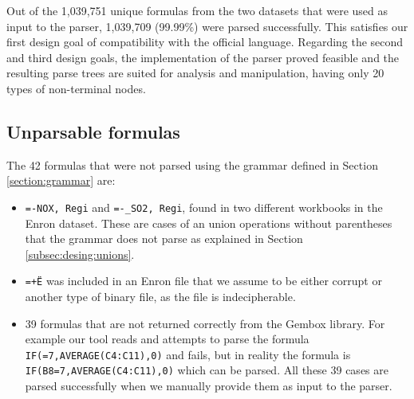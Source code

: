 \documentclass[conference]{IEEEtran}
\begin{document}
Out of the 1,039,751 unique formulas from the two datasets that were used as input to the parser, 1,039,709 (99.99\%) were parsed successfully. This satisfies our first design goal of compatibility with the official language. Regarding the second and third design goals, the implementation of the parser proved feasible and the resulting parse trees are suited for analysis and manipulation, having only 20 types of non-terminal nodes.

\subsection{Unparsable formulas}
\label{subsection:unparsableFormulas}
The 42 formulas that were not parsed using the grammar defined in Section \ref{section:grammar} are:

\begin{itemize}
	\item \texttt{=-NOX, Regi} and \texttt{=-_SO2, Regi}, found in two different workbooks in the Enron dataset. These are cases of an union operations without parentheses that the grammar does not parse as explained in Section \ref{subsec:desing:unions}.
	\item \texttt{=+Ë\textperthousand} was included in an Enron file that we assume to be either corrupt or another type of binary file, as the file is indecipherable.
	\item 39 formulas that are not returned correctly from the Gembox library. For example our tool reads and attempts to parse the formula \texttt{IF(=7,AVERAGE(C4:C11),0)} and fails, but in reality the formula is \texttt{IF(B8=7,AVERAGE(C4:C11),0)} which can be parsed. All these 39 cases are parsed successfully when we manually provide them as input to the parser.
\end{itemize}
\end{document}
